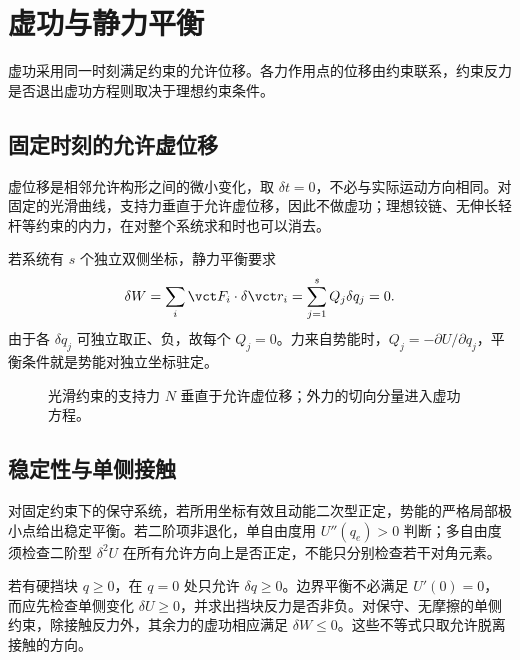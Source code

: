 \documentclass[11pt,openany,fontset=fandol]{ctexbook}
\theoremstyle{definition}\newtheorem{example}{例}[chapter]\newtheorem{exercise}{习题}[chapter]
\begin{document}
\section{虚功与静力平衡}
虚功采用同一时刻满足约束的允许位移。各力作用点的位移由约束联系，约束反力是否退出虚功方程则取决于理想约束条件。

\subsection{固定时刻的允许虚位移}
虚位移是相邻允许构形之间的微小变化，取 $\delta t=0$，不必与实际运动方向相同。对固定的光滑曲线，支持力垂直于允许虚位移，因此不做虚功；理想铰链、无伸长轻杆等约束的内力，在对整个系统求和时也可以消去。

若系统有 $s$ 个独立双侧坐标，静力平衡要求
\begin{equation}\label{mp5:eq:l5-vwork}
\delta W=\sum_i\vct F_i\cdot\delta\vct r_i
=\sum_{j=1}^s Q_j\delta q_j=0.
\end{equation}
由于各 $\delta q_j$ 可独立取正、负，故每个 $Q_j=0$。力来自势能时，$Q_j=-\partial U/\partial q_j$，平衡条件就是势能对独立坐标驻定。


\begin{figure}[H]\centering
{}
\caption{光滑约束的支持力 $N$ 垂直于允许虚位移；外力的切向分量进入虚功方程。}\label{mp5:fig:l5-virtual-normal}
\end{figure}

\subsection{稳定性与单侧接触}
对固定约束下的保守系统，若所用坐标有效且动能二次型正定，势能的严格局部极小点给出稳定平衡。若二阶项非退化，单自由度用 $U''(q_e)>0$ 判断；多自由度须检查二阶型 $\delta^2U$ 在所有允许方向上是否正定，不能只分别检查若干对角元素。

若有硬挡块 $q\ge0$，在 $q=0$ 处只允许 $\delta q\ge0$。边界平衡不必满足 $U'(0)=0$，而应先检查单侧变化 $\delta U\ge0$，并求出挡块反力是否非负。对保守、无摩擦的单侧约束，除接触反力外，其余力的虚功相应满足 $\delta W\le0$。这些不等式只取允许脱离接触的方向。
\end{document}
